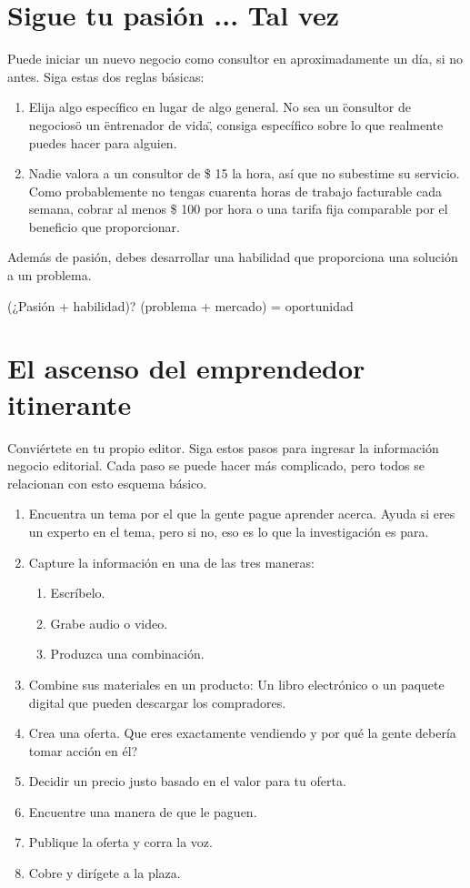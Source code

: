 \documentclass[10pt]{book}
\begin{document}
    \chapter{Sigue tu pasión ... Tal vez}
    Puede iniciar un nuevo negocio como consultor en aproximadamente un día, si no antes. Siga estas dos reglas básicas:
    \begin{enumerate}[\bfseries 1.]
	\item Elija algo específico en lugar de algo general. No sea un \"consultor de negocios\" o un \"entrenador de vida\", consiga específico sobre lo que realmente puedes hacer para alguien.    
	\item Nadie valora a un consultor de \$ 15 la hora, así que no subestime su servicio. Como probablemente no tengas cuarenta horas de trabajo facturable cada semana, cobrar al menos \$ 100 por hora o una tarifa fija comparable por el beneficio que proporcionar.    
    \end{enumerate}
    Además de pasión, debes desarrollar una habilidad que proporciona una solución a un problema.\\
    \begin{center}
	(¿Pasión + habilidad)? (problema + mercado) = oportunidad
    \end{center}

    \chapter{El ascenso del emprendedor itinerante}
    Conviértete en tu propio editor. Siga estos pasos para ingresar la información negocio editorial. Cada paso se puede hacer más complicado, pero todos se relacionan con esto esquema básico.
    \begin{enumerate}[\bfseries 1.]
	    \item Encuentra un tema por el que la gente pague aprender acerca. Ayuda si eres un experto en el tema, pero si no, eso es lo que la investigación es para.    
	    \item Capture la información en una de las tres maneras:
		\begin{enumerate}[\bfseries a)]
		    \item Escríbelo.
		    \item Grabe audio o video.
		    \item Produzca una combinación.
		\end{enumerate}
	    \item Combine sus materiales en un producto: Un libro electrónico o un paquete digital que pueden descargar los compradores.
	    \item Crea una oferta. Que eres exactamente vendiendo y por qué la gente debería tomar acción en él?
	    \item Decidir un precio justo basado en el valor para tu oferta.
	    \item Encuentre una manera de que le paguen.
	    \item Publique la oferta y corra la voz.
	    \item Cobre y dirígete a la plaza.
    \end{enumerate}
\end{document}
